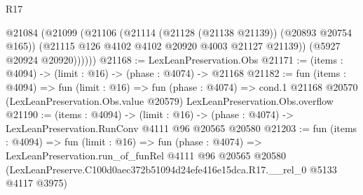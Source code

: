 \begin{lexlean}{R17}
\begin{coremodule}
          @21084
            (@21099
              (@21106
                (@21114 (@21128 (@21138 @21139)) (@20893 @20754 @165))
                (@21115 @126 @4102 @4102 @20920 @4003 @21127 @21139))
              (@5927 @20924 @20920))))))
@21168 := LexLeanPreservation.Obs
@21171 := (items : @4094) -> (limit : @16) -> (phase : @4074) -> @21168
@21182 := fun (items : @4094) =>
  fun (limit : @16) =>
  fun (phase : @4074) =>
  cond.{1} @21168 @20570 (LexLeanPreservation.Obs.value @20579) LexLeanPreservation.Obs.overflow
@21190 := (items : @4094) ->
  (limit : @16) -> (phase : @4074) -> LexLeanPreservation.RunConv @4111 @96 @20565 @20580
@21203 := fun (items : @4094) =>
  fun (limit : @16) =>
  fun (phase : @4074) =>
  LexLeanPreservation.run_of_funRel
    @4111
    @96
    @20565
    @20580
    (LexLeanPreserve.C100d0aec372b51094d24efe416e15dca.R17.__rel_0 @5133 @4117 @3975)
\end{coremodule}
\end{lexlean}
